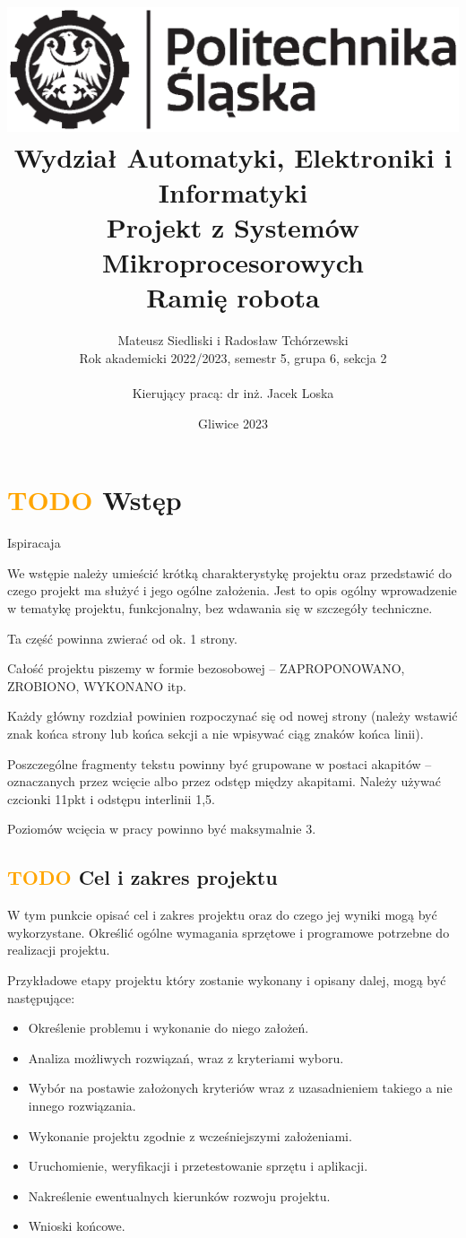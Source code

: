 \documentclass[11pt,titlepage]{article}
\title{
\includegraphics[scale=0.75]{img/politechnika_sl_logo_bw_poziom_pl.eps}\\
\textbf{
Wydział Automatyki, Elektroniki i Informatyki}\\
\vspace*{1cm}
Projekt z Systemów Mikroprocesorowych\\
Ramię robota\\
}
\author{Mateusz Siedliski i Radosław Tchórzewski\\
Rok akademicki 2022/2023, semestr 5, grupa 6, sekcja 2\\
\\
Kierujący pracą: dr inż. Jacek Loska}
\date{Gliwice 2023}
\begin{document}
\onehalfspacing

\maketitle

\tableofcontents

\newpage

\section{\textcolor{orange}{TODO} Wstęp}

Ispiracaja\cite*{HTM_YT}

We wstępie należy umieścić krótką charakterystykę projektu oraz przedstawić do czego projekt ma służyć i jego ogólne założenia. Jest to opis ogólny wprowadzenie w tematykę projektu, funkcjonalny, bez wdawania się w szczegóły techniczne.

Ta część powinna zwierać od ok. 1 strony.

Całość projektu piszemy w formie bezosobowej – ZAPROPONOWANO, ZROBIONO, WYKONANO itp.

Każdy główny rozdział powinien rozpoczynać się od nowej strony (należy wstawić znak końca strony lub końca sekcji a nie wpisywać ciąg znaków końca linii).

Poszczególne fragmenty tekstu powinny być grupowane w postaci akapitów – oznaczanych przez wcięcie albo przez odstęp między akapitami. Należy używać czcionki 11pkt i odstępu interlinii 1,5.

Poziomów wcięcia w pracy powinno być maksymalnie 3.

\subsection{\textcolor{orange}{TODO} Cel i zakres projektu}

W tym punkcie opisać cel i zakres projektu oraz do czego jej wyniki mogą być wykorzystane. Określić ogólne wymagania sprzętowe i programowe potrzebne do realizacji projektu.

Przykładowe etapy projektu który zostanie wykonany i opisany dalej, mogą być następujące:
\begin{itemize}
    \item Określenie problemu i wykonanie do niego założeń.
    \item Analiza możliwych rozwiązań, wraz z kryteriami wyboru.
    \item Wybór na postawie założonych kryteriów wraz z uzasadnieniem takiego a nie innego rozwiązania.
    \item Wykonanie projektu zgodnie z wcześniejszymi założeniami.
    \item Uruchomienie, weryfikacji i przetestowanie sprzętu i aplikacji.
    \item Nakreślenie ewentualnych kierunków rozwoju projektu.
    \item Wnioski końcowe.
\end{itemize}
\end{document}
